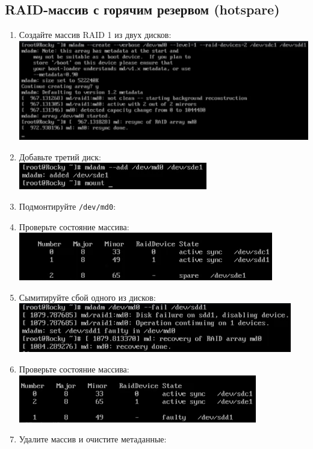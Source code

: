 \documentclass[12pt]{article}
\begin{document}
\subsection{RAID-массив с горячим резервом (hotspare)}
\begin{enumerate}
	\item Создайте массив RAID 1 из двух дисков:
	      \\\includegraphics{13.png}
	\item Добавьте третий диск:
	      \\\includegraphics{14.png}
	\item Подмонтируйте \texttt{/dev/md0}:
	\item Проверьте состояние массива:
	      \\\includegraphics{15.png}
	\item Сымитируйте сбой одного из дисков:
	      \\\includegraphics{16.png}
	\item Проверьте состояние массива:
	      \\\includegraphics{17.png}
	\item Удалите массив и очистите метаданные:
\end{enumerate}
\end{document}
